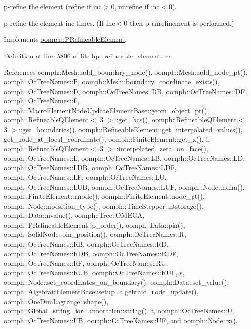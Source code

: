 p-\/refine the element (refine if inc$>$0, unrefine if inc$<$0). 

p-\/refine the element inc times. (If inc$<$0 then p-\/unrefinement is performed.) 

Implements \hyperlink{classoomph_1_1PRefineableElement_a706db9352965197a215405f620b3cedc}{oomph\+::\+P\+Refineable\+Element}.



Definition at line 5806 of file hp\+\_\+refineable\+\_\+elements.\+cc.



References oomph\+::\+Mesh\+::add\+\_\+boundary\+\_\+node(), oomph\+::\+Mesh\+::add\+\_\+node\+\_\+pt(), oomph\+::\+Oc\+Tree\+Names\+::B, oomph\+::\+Mesh\+::boundary\+\_\+coordinate\+\_\+exists(), oomph\+::\+Oc\+Tree\+Names\+::D, oomph\+::\+Oc\+Tree\+Names\+::\+DB, oomph\+::\+Oc\+Tree\+Names\+::\+DF, oomph\+::\+Oc\+Tree\+Names\+::F, oomph\+::\+Macro\+Element\+Node\+Update\+Element\+Base\+::geom\+\_\+object\+\_\+pt(), oomph\+::\+Refineable\+Q\+Element$<$ 3 $>$\+::get\+\_\+bcs(), oomph\+::\+Refineable\+Q\+Element$<$ 3 $>$\+::get\+\_\+boundaries(), oomph\+::\+Refineable\+Element\+::get\+\_\+interpolated\+\_\+values(), get\+\_\+node\+\_\+at\+\_\+local\+\_\+coordinate(), oomph\+::\+Finite\+Element\+::get\+\_\+x(), i, oomph\+::\+Refineable\+Q\+Element$<$ 3 $>$\+::interpolated\+\_\+zeta\+\_\+on\+\_\+face(), oomph\+::\+Oc\+Tree\+Names\+::L, oomph\+::\+Oc\+Tree\+Names\+::\+LB, oomph\+::\+Oc\+Tree\+Names\+::\+LD, oomph\+::\+Oc\+Tree\+Names\+::\+L\+DB, oomph\+::\+Oc\+Tree\+Names\+::\+L\+DF, oomph\+::\+Oc\+Tree\+Names\+::\+LF, oomph\+::\+Oc\+Tree\+Names\+::\+LU, oomph\+::\+Oc\+Tree\+Names\+::\+L\+UB, oomph\+::\+Oc\+Tree\+Names\+::\+L\+UF, oomph\+::\+Node\+::ndim(), oomph\+::\+Finite\+Element\+::nnode(), oomph\+::\+Finite\+Element\+::node\+\_\+pt(), oomph\+::\+Node\+::nposition\+\_\+type(), oomph\+::\+Time\+Stepper\+::ntstorage(), oomph\+::\+Data\+::nvalue(), oomph\+::\+Tree\+::\+O\+M\+E\+GA, oomph\+::\+P\+Refineable\+Element\+::p\+\_\+order(), oomph\+::\+Data\+::pin(), oomph\+::\+Solid\+Node\+::pin\+\_\+position(), oomph\+::\+Oc\+Tree\+Names\+::R, oomph\+::\+Oc\+Tree\+Names\+::\+RB, oomph\+::\+Oc\+Tree\+Names\+::\+RD, oomph\+::\+Oc\+Tree\+Names\+::\+R\+DB, oomph\+::\+Oc\+Tree\+Names\+::\+R\+DF, oomph\+::\+Oc\+Tree\+Names\+::\+RF, oomph\+::\+Oc\+Tree\+Names\+::\+RU, oomph\+::\+Oc\+Tree\+Names\+::\+R\+UB, oomph\+::\+Oc\+Tree\+Names\+::\+R\+UF, s, oomph\+::\+Node\+::set\+\_\+coordinates\+\_\+on\+\_\+boundary(), oomph\+::\+Data\+::set\+\_\+value(), oomph\+::\+Algebraic\+Element\+Base\+::setup\+\_\+algebraic\+\_\+node\+\_\+update(), oomph\+::\+One\+Dim\+Lagrange\+::shape(), oomph\+::\+Global\+\_\+string\+\_\+for\+\_\+annotation\+::string(), t, oomph\+::\+Oc\+Tree\+Names\+::U, oomph\+::\+Oc\+Tree\+Names\+::\+UB, oomph\+::\+Oc\+Tree\+Names\+::\+UF, and oomph\+::\+Node\+::x().

